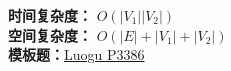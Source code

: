 \textbf{时间复杂度：} $O(|V_1||V_2|)$ \\
\textbf{空间复杂度：} $O(|E| + |V_1| + |V_2|)$ \\
\textbf{模板题：}\href{https://www.luogu.com.cn/problem/P3386}{Luogu P3386}